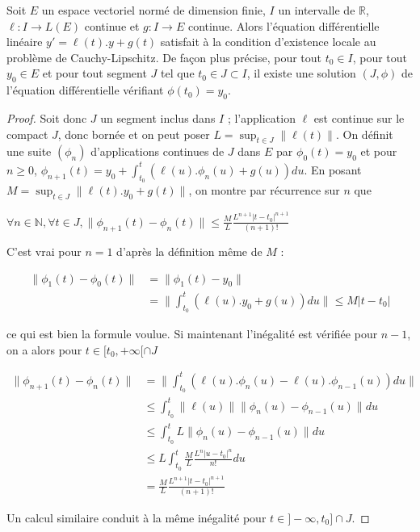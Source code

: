 \begin{lem}
Soit $E$ un espace vectoriel normé de dimension finie, $I$ un
intervalle de $\mathbb{R}$, $\ell : I \rightarrow L(E)$ continue et $g : I \rightarrow E$ continue. Alors
l'équation différentielle linéaire $y' = \ell(t).y + g(t)$ satisfait à la
condition d'existence locale au problème de Cauchy-Lipschitz. De
façon plus précise, pour tout $t_0 \in I$,
pour tout $y_0 \in E$ et pour tout segment $J$ tel que $t_0 \in J \subset I$, il existe une solution $(J,\phi)$ de l'équation différentielle
vérifiant $\phi(t_0) = y_0$.
\end{lem}

\begin{proof}
Soit donc $J$ un segment inclus dans $I$ ; l'application $\ell$ est
continue sur le compact $J$, donc bornée et on peut poser $L = \sup_{t \in J} \|\ell(t)\|$.
On définit une suite $(\phi_n)$ d'applications continues de $J$ dans $E$
par $\phi_0(t) = y_0$ et pour $n \geq 0$, $\phi_{n+1}(t) =
y_0 + \int_{t_0}^t (\ell(u).\phi_n(u) + g(u)) du$. En posant $M = \sup_{t \in J} \|\ell(t).y_0 + g(t)\|$, on montre par récurrence sur $n$ que

$\forall n \in \mathbb{N}, \forall t \in J,
\|\phi_{n+1}(t) - \phi_n(t)\| \leq \frac{M}{L} \frac{L^{n+1}|t - t_0|^{n+1}}{(n + 1)!}$

C'est vrai pour $n = 1$ d'après la définition même de $M$ :

\begin{align*}
\|\phi_1(t) - \phi_0(t)\| &= \|\phi_1(t) - y_0\| \\
&= \|\int_{t_0}^t (\ell(u).y_0 + g(u)) du\| \leq M|t - t_0|
\end{align*}

ce qui est bien la formule voulue. Si maintenant l'inégalité est
vérifiée pour $n - 1$, on a alors pour $t \in [t_0,+\infty[ \cap J$

\begin{align*}
\|\phi_{n+1}(t) - \phi_n(t)\| &= \|\int_{t_0}^t (\ell(u).\phi_n(u) - \ell(u).\phi_{n-1}(u)) du\| \\
&\leq \int_{t_0}^t \|\ell(u)\| \|\phi_n(u) - \phi_{n-1}(u)\| du \\
&\leq \int_{t_0}^t L \|\phi_n(u) - \phi_{n-1}(u)\| du \\
&\leq L \int_{t_0}^t \frac{M}{L} \frac{L^n |u - t_0|^n}{n!} du \\
&= \frac{M}{L} \frac{L^{n+1}|t - t_0|^{n+1}}{(n + 1)!}
\end{align*}

Un calcul similaire conduit à la même inégalité pour $t \in ]-\infty,t_0] \cap J$.


\end{proof}
